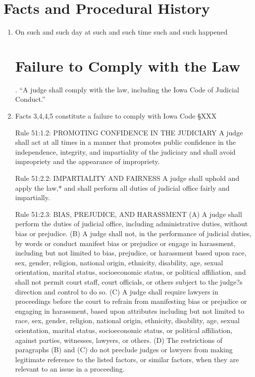 \documentclass[12pt,\documentclassflag]{complaint}
\begin{document}
\makecaption

\section*{Facts and Procedural History}
\thispagestyle{empty}
\begin{enumerate}

\item On such and such day at such and such time such and such happened







\section{Failure to Comply with the Law} 
 \See {}.  ``A judge shall comply with the law, including the Iowa Code of Judicial Conduct.''

\item Facts 3,4,4,5  constitute a failure to comply with Iowa Code \S XXX  


 



Rule 51:1.2: PROMOTING CONFIDENCE IN THE JUDICIARY
A judge shall act at all times in a manner that promotes public confidence in the independence, integrity, and impartiality of the judiciary and shall avoid impropriety and the appearance of impropriety.

Rule 51:2.2: IMPARTIALITY AND FAIRNESS
A judge shall uphold and apply the law,* and shall perform all duties of judicial office fairly and impartially.

Rule 51:2.3: BIAS, PREJUDICE, AND HARASSMENT
(A) A judge shall perform the duties of judicial office, including administrative duties, without bias or prejudice.
(B) A judge shall not, in the performance of judicial duties, by words or conduct manifest bias or prejudice or engage in harassment, including but not limited to bias, prejudice, or harassment based upon race, sex, gender, religion, national origin, ethnicity, disability, age, sexual orientation, marital status, socioeconomic status, or political affiliation, and shall not permit court staff, court officials, or others subject to the judge?s direction and control to do so.
(C) A judge shall require lawyers in proceedings before the court to refrain from manifesting bias or prejudice or engaging in harassment, based upon attributes including but not limited to race, sex, gender, religion, national origin, ethnicity, disability, age, sexual orientation, marital status, socioeconomic status, or political affiliation, against parties, witnesses, lawyers, or others.
(D) The restrictions of paragraphs (B) and (C) do not preclude judges or lawyers from making legitimate reference to the listed factors, or similar factors, when they are relevant to an issue in a proceeding.



\end{enumerate}
\end{document}
